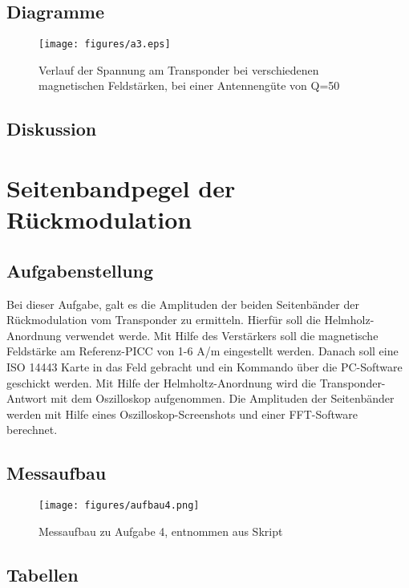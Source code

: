 \documentclass[12pt,a4paper,ngerman]{article}
\begin{document}
\pagebreak
\subsection{Diagramme}
\begin{figure}[H]
\centering
\texttt{[image: figures/a3.eps]} 
\caption{Verlauf der Spannung am Transponder bei verschiedenen magnetischen Feldstärken, bei einer Antennengüte von Q=50}
\label{fig:1_q5}
\end{figure}

\subsection{Diskussion}


\pagebreak
\section{Seitenbandpegel der Rückmodulation}
\subsection{Aufgabenstellung}
Bei dieser Aufgabe, galt es die Amplituden der beiden Seitenbänder der Rückmodulation vom Transponder zu ermitteln. Hierfür soll die Helmholz-Anordnung verwendet werde. Mit Hilfe des Verstärkers soll die magnetische Feldstärke am Referenz-PICC von 1-6 A/m eingestellt werden. Danach soll eine ISO 14443 Karte in das Feld gebracht und ein Kommando über die PC-Software geschickt werden. Mit Hilfe der Helmholtz-Anordnung wird die Transponder-Antwort mit dem Oszilloskop aufgenommen. Die Amplituden der Seitenbänder werden mit Hilfe eines Oszilloskop-Screenshots und einer FFT-Software berechnet. 

\subsection{Messaufbau}

\begin{figure}[H]
\centering
\texttt{[image: figures/aufbau4.png]} 
\caption{Messaufbau zu Aufgabe 4, entnommen aus Skript \cite[S.39 Abbildung 42]{skript}}
\label{fig:aufbau4}
\end{figure}

\subsection{Tabellen}
\end{document}
